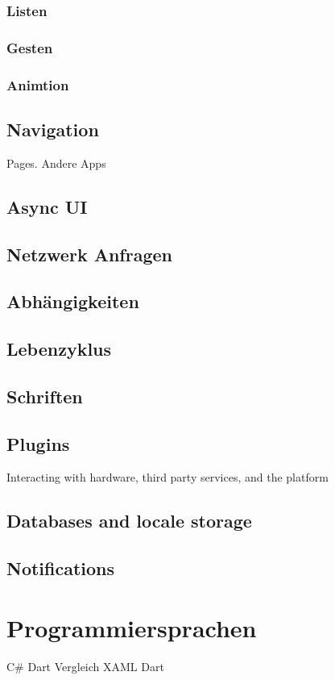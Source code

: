 \subsubsection{Listen}
\subsubsection{Gesten}
\subsubsection{Animtion}

\subsection{Navigation}
Pages.
Andere Apps
\subsection{Async UI}
\subsection{Netzwerk Anfragen}
\subsection{Abhängigkeiten}
\subsection{Lebenzyklus}
\subsection{Schriften}
\subsection{Plugins}
Interacting with hardware, third party services, and the platform
\subsection{Databases and locale storage}
\subsection{Notifications}
\section{Programmiersprachen}
C\# Dart Vergleich
XAML Dart

